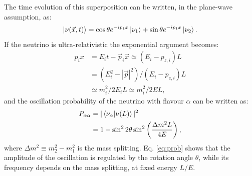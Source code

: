 The time evolution of this superposition can be written, in the plane-wave assumption, as:
\begin{equation}
    \ket{\nu(\vec{x},t)} = \cos\theta e^{-ip_{1}x}\ket{\nu_{1}}+\sin\theta e^{-ip_{1}x}\ket{\nu_{2}}.
\end{equation}
If the neutrino is ultra-relativistic the exponential argument becomes:
\begin{equation}
\begin{split}
    p_{i}x & = E_{i}t - \vec{p}_{i}\vec{x} \simeq (E_{i}-p_{z,i})L\\
           & = (E_{i}^2-|\vec{p}|^{2})/(E_{i}-p_{z,i})L\\
           & \simeq m_i^{2}/2E_{i}L \simeq m_i^{2}/2E L,
\end{split}
\end{equation}
and the oscillation probability of the neutrino with flavour $\alpha$ can be written as:
\begin{equation}
\begin{split}
    P_{\alpha\alpha} & = |\bra{\nu_{\alpha}}\ket{\nu(L)}|^2\\
                     & = 1 - \sin^2 2\theta \sin^2\left(\frac{\Delta m^{2}L}{4E}\right),\label{eq:prob}
\end{split}
\end{equation}
where $\Delta m^{2} \equiv m^2_2-m^2_1$ is the mass splitting. 
Eq. \eqref{eq:prob} shows that the amplitude of the oscillation is regulated by the rotation angle $\theta$, while its frequency depends on the mass splitting, at fixed energy $L/E$.

